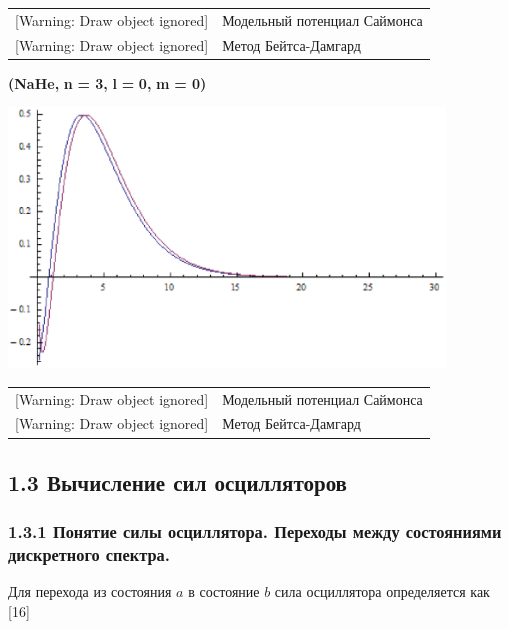 \begin{flushleft}
\tablefirsthead{}
\tablehead{}
\tabletail{}
\tablelasttail{}
\begin{supertabular}{m{3.741cm}m{12.927cm}}
[Warning: Draw object ignored] &
Модельный потенциал
Саймонса\\
{}[Warning: Draw object ignored] &
Метод
Бейтса-Дамгард\\
\end{supertabular}
\end{flushleft}

\bigskip

\textbf{(}\foreignlanguage{english}{\textbf{NaHe}}\textbf{, }\foreignlanguage{english}{\textbf{n}}\textbf{ = 3,
}\foreignlanguage{english}{\textbf{l}}\textbf{ = }\foreignlanguage{english}{\textbf{0}}\textbf{,
}\foreignlanguage{english}{\textbf{m}}\textbf{ = 0)}

\includegraphics[width=11.592cm,height=6.904cm]{chervinskaya-15.eps}


\begin{flushleft}
\tablefirsthead{}
\tablehead{}
\tabletail{}
\tablelasttail{}
\begin{supertabular}{m{3.741cm}m{12.927cm}}
[Warning: Draw object ignored] &
Модельный потенциал
Саймонса\\
{}[Warning: Draw object ignored] &
Метод
Бейтса-Дамгард\\
\end{supertabular}
\end{flushleft}
\clearpage\subsection[1.3 Вычисление
сил осцилляторов]{1.3
Вычисление сил
осцилляторов}
\subsubsection[1.3.1 Понятие
силы осциллятора. Переходы между состояниями дискретного
спектра.]{1.3.1 Понятие
силы осциллятора. Переходы между состояниями дискретного
спектра.}
Для перехода
из состояния $a$
в состояние $b$
сила осциллятора
определяется как [16]

